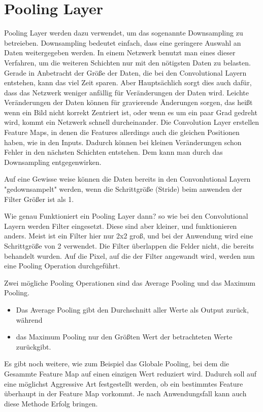 \documentclass[12pt]{article}
\begin{document}
\section{Pooling Layer}
Pooling Layer werden dazu verwendet, um das sogenannte Downsampling zu betreieben. Downsampling bedeutet einfach, dass eine geringere Auswahl an Daten weitergegeben werden.
In einem Netzwerk benutzt man eines dieser Verfahren, um die weiteren Schichten nur mit den nötigsten Daten zu belasten. Gerade in Anbetracht der Größe der Daten, die bei den Convolutional Layern entstehen, kann das viel Zeit sparen. Aber Hauptsächlich sorgt dies auch dafür, dass das Netzwerk weniger anfällig für Veränderungen der Daten wird. Leichte Veränderungen der Daten können für gravierende Änderungen sorgen, das heißt wenn ein Bild nicht korrekt Zentriert ist, oder wenn es um ein paar Grad gedreht wird, kommt ein Netzwerk schnell durcheinander.
Die Convolution Layer erstellen Feature Maps, in denen die Features allerdings auch die gleichen Positionen haben, wie in den Inputs. Dadurch können bei kleinen Veränderungen schon Fehler in den nächsten Schichten entstehen. Dem kann man durch das Downsampling entgegenwirken.

Auf eine Gewisse weise können die Daten bereits in den Convonlutional Layern "gedownsampelt" werden, wenn die Schrittgröße (Stride) beim anwenden der Filter Größer ist als 1.

Wie genau Funktioniert ein Pooling Layer dann? so wie bei den Convolutional Layern werden Filter eingesetzt. Diese sind aber kleiner, und funktionieren anders. Meist ist ein Filter hier nur 2x2 groß, und bei der Anwendung wird eine Schrittgröße von 2 verwendet. Die Filter überlappen die Felder nicht, die bereits behandelt wurden. 
Auf die Pixel, auf die der Filter angewandt wird, werden nun eine Pooling Operation durchgeführt. 

Zwei mögliche Pooling Operationen sind das Average Pooling und das Maximum Pooling. 
\begin{itemize}
  \item Das Average Pooling gibt den Durchschnitt aller Werte als Output zurück, während
  \item das Maximum Pooling nur den Größten Wert der betrachteten Werte zurückgibt.
\end{itemize}
Es gibt noch weitere, wie zum Beispiel das Globale Pooling, bei dem die Gesammte Feature Map auf einen einzigen Wert reduziert wird. Dadurch soll auf eine möglichst Aggressive Art festgestellt werden, ob ein bestimmtes Feature überhaupt in der Feature Map vorkommt. Je nach Anwendungsfall kann auch diese Methode Erfolg bringen.
\end{document}

